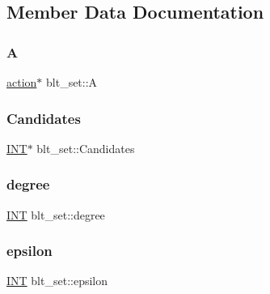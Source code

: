 \subsection{Member Data Documentation}
\mbox{\label{classblt__set_a77dfc0a456c029e4900eacf77f8c445e}} 
\subsubsection{\texorpdfstring{A}{A}}
{\footnotesize\ttfamily \mbox{\hyperlink{classaction}{action}}$\ast$ blt\+\_\+set\+::A}

\mbox{\label{classblt__set_a563d8e7123a467d22fbb02bd5b3cf9da}} 
\subsubsection{\texorpdfstring{Candidates}{Candidates}}
{\footnotesize\ttfamily \mbox{\hyperlink{galois_8h_a09fddde158a3a20bd2dcadb609de11dc}{I\+NT}}$\ast$ blt\+\_\+set\+::\+Candidates}

\mbox{\label{classblt__set_a3de62dd2090500e7fadf2e82334d0534}} 
\subsubsection{\texorpdfstring{degree}{degree}}
{\footnotesize\ttfamily \mbox{\hyperlink{galois_8h_a09fddde158a3a20bd2dcadb609de11dc}{I\+NT}} blt\+\_\+set\+::degree}

\mbox{\label{classblt__set_a0eeeaa45d2e49b935efa938704ef4e62}} 
\subsubsection{\texorpdfstring{epsilon}{epsilon}}
{\footnotesize\ttfamily \mbox{\hyperlink{galois_8h_a09fddde158a3a20bd2dcadb609de11dc}{I\+NT}} blt\+\_\+set\+::epsilon}

\mbox{\label{classblt__set_ae3a4dd741b4d034599339e933d2599a0}} 
